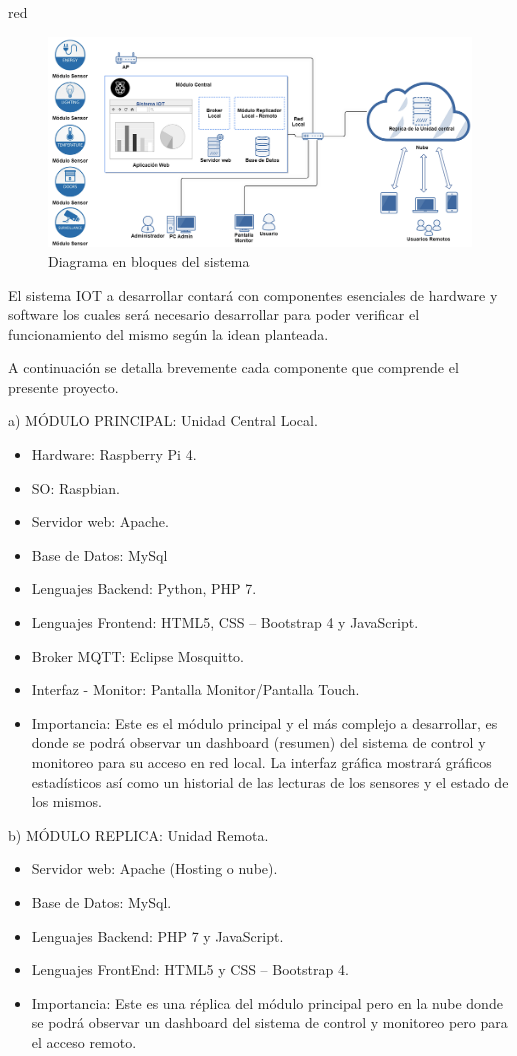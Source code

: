 \documentclass[11pt]{charter}
\begin{document}
\begin{consigna}{red}
\begin{figure}[htpb]
\centering 
\includegraphics[width=1.07\textwidth]{./Figuras/diagBloques.png}
\caption{Diagrama en bloques del sistema}
\label{fig:diagBloques}
\end{figure}

\vspace{20px}

El sistema IOT a desarrollar contará con componentes esenciales de hardware y software los cuales será necesario desarrollar para poder verificar el funcionamiento del mismo según la idean planteada. 

A continuación se detalla brevemente cada componente que comprende el presente proyecto.

a) MÓDULO PRINCIPAL: Unidad Central Local.
\begin{itemize}
\item Hardware: Raspberry Pi 4.
\item SO: Raspbian.
\item Servidor web: Apache.
\item Base de Datos: MySql
\item Lenguajes Backend: Python, PHP 7.
\item Lenguajes Frontend: HTML5, CSS – Bootstrap 4 y JavaScript.
\item Broker MQTT: Eclipse Mosquitto.
\item Interfaz - Monitor: Pantalla Monitor/Pantalla Touch.
\item Importancia: Este es el módulo principal y el más complejo a desarrollar, es donde se podrá observar un dashboard (resumen) del sistema de control y monitoreo para su acceso en red local. La interfaz gráfica mostrará gráficos estadísticos así como un historial de las lecturas de los sensores y el estado de los mismos.
\end{itemize}

b) MÓDULO REPLICA: Unidad Remota.
\begin{itemize}
\item Servidor web: Apache (Hosting o nube).
\item Base de Datos: MySql.
\item Lenguajes Backend: PHP 7 y JavaScript.
\item Lenguajes FrontEnd: HTML5 y CSS – Bootstrap 4.
\item Importancia: Este es una réplica del módulo principal pero en la nube donde se podrá observar un dashboard del sistema de control y monitoreo pero para el acceso remoto.
\end{itemize}



\end{consigna}
\end{document}
